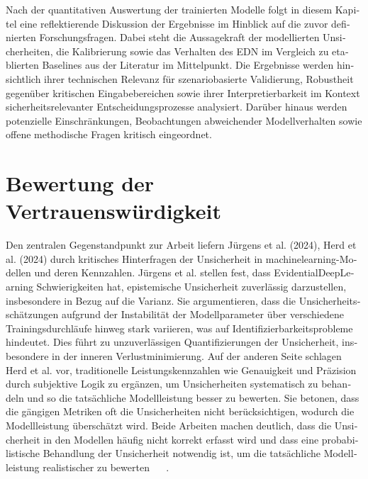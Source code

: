 


\begin{otherlanguage}{ngerman}
Nach der quantitativen Auswertung der trainierten Modelle folgt in diesem Kapitel eine reflektierende Diskussion der Ergebnisse im Hinblick auf die zuvor definierten Forschungsfragen. Dabei steht die Aussagekraft der modellierten Unsicherheiten, die Kalibrierung sowie das Verhalten des EDN im Vergleich zu etablierten Baselines aus der Literatur im Mittelpunkt. Die Ergebnisse werden hinsichtlich ihrer technischen Relevanz für szenariobasierte Validierung, Robustheit gegenüber kritischen Eingabebereichen sowie ihrer Interpretierbarkeit im Kontext sicherheitsrelevanter Entscheidungsprozesse analysiert. Darüber hinaus werden potenzielle Einschränkungen, Beobachtungen abweichender Modellverhalten sowie offene methodische Fragen kritisch eingeordnet.

\section{Bewertung der Vertrauenswürdigkeit}


Den zentralen Gegenstandpunkt zur Arbeit liefern Jürgens et al. (2024), Herd et al. (2024) durch kritisches Hinterfragen der Unsicherheit in \gls{machinelearning}-Modellen und deren Kennzahlen. Jürgens et al. stellen fest, dass \gls{EvidentialDeepLearning} Schwierigkeiten hat, epistemische Unsicherheit zuverlässig darzustellen, insbesondere in Bezug auf die Varianz. Sie argumentieren, dass die Unsicherheitsschätzungen aufgrund der Instabilität der Modellparameter über verschiedene Trainingsdurchläufe hinweg stark variieren, was auf Identifizierbarkeitsprobleme hindeutet. Dies führt zu unzuverlässigen Quantifizierungen der Unsicherheit, insbesondere in der inneren Verlustminimierung. Auf der anderen Seite schlagen Herd et al. vor, traditionelle Leistungskennzahlen wie Genauigkeit und Präzision durch subjektive Logik zu ergänzen, um Unsicherheiten systematisch zu behandeln und so die tatsächliche Modellleistung besser zu bewerten. Sie betonen, dass die gängigen Metriken oft die Unsicherheiten nicht berücksichtigen, wodurch die Modellleistung überschätzt wird. Beide Arbeiten machen deutlich, dass die Unsicherheit in den Modellen häufig nicht korrekt erfasst wird und dass eine probabilistische Behandlung der Unsicherheit notwendig ist, um die tatsächliche Modellleistung realistischer zu bewerten ~\parencite{Jurgens.} ~\parencite{Herd04082024}.


\end{otherlanguage}
